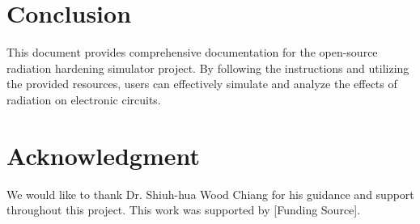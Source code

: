 \documentclass[12pt]{article}
\begin{document}
    \section{Conclusion}\label{sec:conclusion}
    This document provides comprehensive documentation for the open-source radiation hardening simulator project.
    By following the instructions and utilizing the provided resources, users can effectively simulate and analyze the effects of radiation on electronic circuits.

    \section*{Acknowledgment}
    We would like to thank Dr. Shiuh-hua Wood Chiang for his guidance and support throughout this project.
    This work was supported by [Funding Source].
\end{document}
